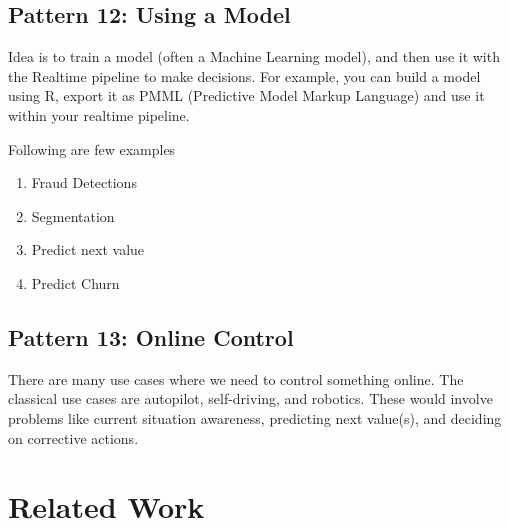 \documentclass{sig-alternate}
\begin{document}
\subsection{Pattern 12: Using a Model} 
Idea is to train a model (often a Machine Learning model), and then use it with the Realtime pipeline to make decisions. For example, you can build a model using R, export it as PMML (Predictive Model Markup Language) and use it within your realtime pipeline. 

Following are few examples
\begin{enumerate}
\item Fraud Detections 
\item Segmentation 
\item Predict next value 
\item Predict Churn 
\end{enumerate}


\subsection{Pattern 13: Online Control} 
There are many use cases where we need to control something online. The classical use cases are autopilot, self-driving, and robotics. These would involve problems like current situation awareness, predicting next value(s), and deciding on corrective actions. 


\section{Related Work}
\end{document}
